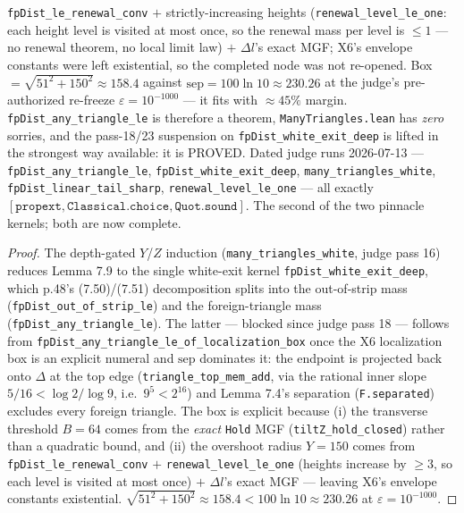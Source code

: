 \begin{lemma}
\texttt{fpDist\_le\_renewal\_conv} \(+\) strictly-increasing heights
(\texttt{renewal\_level\_le\_one}: each height level is visited at most once, so the renewal
mass per level is \(\le 1\) --- no renewal theorem, no local limit law) \(+\) \(\Delta l\)'s
exact MGF; X6's envelope constants were left existential, so the completed node was not
re-opened.  Box \(= \sqrt{51^2+150^2} \approx 158.4\) against \(\mathrm{sep} = 100\ln 10
\approx 230.26\) at the judge's pre-authorized re-freeze \(\varepsilon = 10^{-1000}\) --- it
fits with \(\approx 45\%\) margin.  \texttt{fpDist\_any\_triangle\_le} is therefore a
theorem, \texttt{ManyTriangles.lean} has \emph{zero} sorries, and the pass-18/23
suspension on \texttt{fpDist\_white\_exit\_deep} is lifted in the strongest way available:
it is PROVED.  Dated judge runs 2026-07-13 --- \texttt{fpDist\_any\_triangle\_le},
\texttt{fpDist\_white\_exit\_deep}, \texttt{many\_triangles\_white},
\texttt{fpDist\_linear\_tail\_sharp}, \texttt{renewal\_level\_le\_one} --- all exactly
\([\texttt{propext}, \texttt{Classical.choice}, \texttt{Quot.sound}]\).  The second of the
two pinnacle kernels; both are now complete.
\end{lemma}
\begin{proof}
  \leanok
  The depth-gated \(Y\)/\(Z\) induction (\texttt{many\_triangles\_white}, judge pass 16)
  reduces Lemma 7.9 to the single white-exit kernel \texttt{fpDist\_white\_exit\_deep},
  which p.48's (7.50)/(7.51) decomposition splits into the out-of-strip mass
  (\texttt{fpDist\_out\_of\_strip\_le}) and the foreign-triangle mass
  (\texttt{fpDist\_any\_triangle\_le}).  The latter --- blocked since judge pass 18 ---
  follows from \texttt{fpDist\_any\_triangle\_le\_of\_localization\_box} once the X6
  localization box is an explicit numeral and \(\mathrm{sep}\) dominates it: the endpoint
  is projected back onto \(\Delta\) at the top edge (\texttt{triangle\_top\_mem\_add}, via
  the rational inner slope \(5/16 < \log 2/\log 9\), i.e.\ \(9^5 < 2^{16}\)) and Lemma
  7.4's separation (\texttt{F.separated}) excludes every foreign triangle.  The box is
  explicit because (i) the transverse threshold \(B = 64\) comes from the \emph{exact}
  \texttt{Hold} MGF (\texttt{tiltZ\_hold\_closed}) rather than a quadratic bound, and
  (ii) the overshoot radius \(Y = 150\) comes from \texttt{fpDist\_le\_renewal\_conv}
  \(+\) \texttt{renewal\_level\_le\_one} (heights increase by \(\ge 3\), so each level is
  visited at most once) \(+\) \(\Delta l\)'s exact MGF --- leaving X6's envelope constants
  existential.  \(\sqrt{51^2+150^2} \approx 158.4 < 100\ln 10 \approx 230.26\) at
  \(\varepsilon = 10^{-1000}\).
\end{proof}

